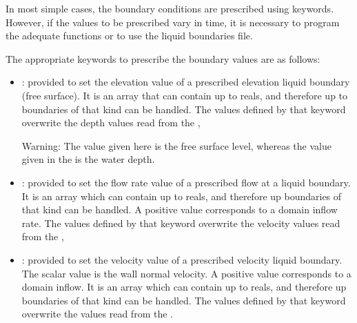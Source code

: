 In most simple cases, the boundary conditions are prescribed using keywords.
However, if the values to be prescribed vary in time, it is necessary to program
the adequate functions or to use the liquid boundaries file.

The appropriate keywords to prescribe the boundary values are as follows:

\begin{itemize}
\item {}: provided to set the
elevation value of a prescribed elevation liquid boundary (free surface).
It is an array that can contain up to  reals, and therefore up
to  boundaries of that kind can be handled.
The values defined by that keyword overwrite the depth values read
from the ,

\begin{WarningBlock}{Warning:}
The value given here is the free surface level, whereas the value given
in the  is the water depth.
\end{WarningBlock}

\item {}: provided to set the flow rate value of a
prescribed flow at a liquid boundary.
It is an array which can contain up to  reals, and therefore up
 boundaries of that kind can be handled.
A positive value corresponds to a domain inflow rate.
The values defined by that keyword overwrite the velocity values read
from the ,

\item {}: provided to set the velocity value of a
prescribed velocity liquid boundary.
The scalar value is the wall normal velocity.
A positive value corresponds to a domain inflow.
It is an array which can contain up to  reals, and therefore up
 boundaries of that kind can be handled.
The values defined by that keyword overwrite the values read from the
.
\end{itemize}

